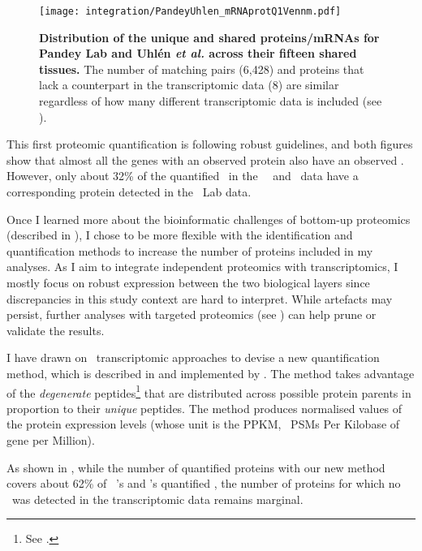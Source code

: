\begin{figure}[!htb]
    \texttt{[image: integration/PandeyUhlen\_mRNAprotQ1Vennm.pdf]}\centering
    \caption[Distribution of the unique and shared proteins/mRNAs for Pandey Lab
    and Uhlén \textit{et al.} across fifteen tissues.]{%
    \label{fig:PU_vennQ1}\textbf{Distribution of the unique and shared proteins/mRNAs
    for Pandey Lab and Uhlén \textit{et al.} across their fifteen shared tissues.}
    The number of matching pairs (6,428) and proteins that lack a counterpart in
    the transcriptomic data (8) are similar regardless of how many different
    transcriptomic data is included (see ).}
\end{figure}

This first proteomic quantification is following robust guidelines,
and both figures show that
almost all the genes with an observed protein
also have an observed \mRNA{}.
However, only about 32\% of the quantified \mRNAs\
in the \uhlen\ \etal\ and \gtex\ data
have a corresponding protein detected in the \pandey\ Lab data.\mybr\

Once I learned more about the bioinformatic challenges of bottom-up proteomics
(described in \Cref{sec:bioinfProt}),
I chose to be more flexible with the identification and quantification methods
to increase the number of proteins included in my analyses.
As I aim to integrate independent proteomics with transcriptomics,
I mostly focus on robust expression between the two biological layers
since discrepancies in this study context are hard to interpret.
While artefacts may persist,
further analyses with targeted proteomics (see )
can help prune or validate the results.\mybr\

I have drawn on \Rnaseq\ transcriptomic approaches to devise
a new quantification method, which is described in 
and implemented by \james.
The method takes advantage of the \emph{degenerate} peptides\footnote{%
See \Cref{subsec:proteinInference}.}
that are distributed across possible protein parents
in proportion to their \emph{unique} peptides.
The method produces normalised values of the protein expression levels
(whose unit is the \gls{PPKM}, \ie\ \glspl{PSM} Per Kilobase of gene per Million).\mybr\

As shown in ,
while the number of quantified proteins
with our new method
covers about 62\% of \uhlen\ \etal{}'s and \gtex{}'s quantified \mRNAs,
the number of proteins for which no \mRNA\ was detected
in the transcriptomic data remains marginal.\mybr\

